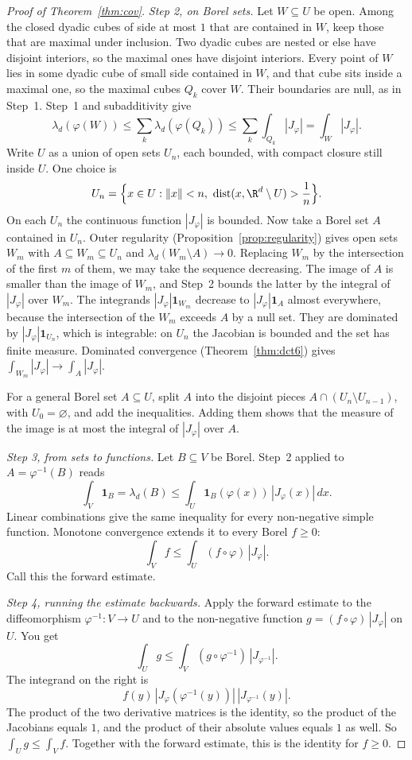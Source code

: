 \begin{proof}[Proof of Theorem~\ref{thm:cov}]
\emph{Step 2, on Borel sets.} Let $W\subseteq U$ be open. Among the closed dyadic cubes of side at most $1$ that are contained in $W$, keep those that are maximal under inclusion. Two dyadic cubes are nested or else have disjoint interiors, so the maximal ones have disjoint interiors. Every point of $W$ lies in some dyadic cube of small side contained in $W$, and that cube sits inside a maximal one, so the maximal cubes $Q_k$ cover $W$. Their boundaries are null, as in Step~1. Step~1 and subadditivity give
\[
\lambda_d(\varphi(W))\le\sum_k\lambda_d(\varphi(Q_k))\le\sum_k\int_{Q_k}|J_\varphi|=\int_W|J_\varphi|.
\]
Write $U$ as a union of open sets $U_n$, each bounded, with compact closure still inside $U$. One choice is
\[
U_n=\Bigl\{x\in U:\|x\|<n,\ \mathrm{dist}(x,\R^d\setminus U)>\frac1n\Bigr\}.
\]
On each $U_n$ the continuous function $|J_\varphi|$ is bounded. Now take a Borel set $A$ contained in $U_n$. Outer regularity (Proposition~\ref{prop:regularity}) gives open sets $W_m$ with $A\subseteq W_m\subseteq U_n$ and $\lambda_d(W_m\setminus A)\to 0$. Replacing $W_m$ by the intersection of the first $m$ of them, we may take the sequence decreasing. The image of $A$ is smaller than the image of $W_m$, and Step~2 bounds the latter by the integral of $|J_\varphi|$ over $W_m$. The integrands $|J_\varphi|\mathbf 1_{W_m}$ decrease to $|J_\varphi|\mathbf 1_A$ almost everywhere, because the intersection of the $W_m$ exceeds $A$ by a null set. They are dominated by $|J_\varphi|\mathbf 1_{U_n}$, which is integrable: on $U_n$ the Jacobian is bounded and the set has finite measure. Dominated convergence (Theorem~\ref{thm:dct6}) gives $\int_{W_m}|J_\varphi|\to\int_A|J_\varphi|$.

For a general Borel set $A\subseteq U$, split $A$ into the disjoint pieces $A\cap(U_n\setminus U_{n-1})$, with $U_0=\varnothing$, and add the inequalities. Adding them shows that the measure of the image is at most the integral of $|J_\varphi|$ over $A$.

\emph{Step 3, from sets to functions.} Let $B\subseteq V$ be Borel. Step~2 applied to $A=\varphi^{-1}(B)$ reads
\[
\int_V\mathbf 1_B=\lambda_d(B)\le\int_U\mathbf 1_B(\varphi(x))\,|J_\varphi(x)|\,dx.
\]
Linear combinations give the same inequality for every non-negative simple function. Monotone convergence extends it to every Borel $f\ge 0$:
\[
\int_V f\le\int_U(f\circ\varphi)\,|J_\varphi|.
\]
Call this the forward estimate.

\emph{Step 4, running the estimate backwards.} Apply the forward estimate to the diffeomorphism $\varphi^{-1}:V\to U$ and to the non-negative function $g=(f\circ\varphi)\,|J_\varphi|$ on $U$. You get
\[
\int_U g\le\int_V(g\circ\varphi^{-1})\,|J_{\varphi^{-1}}|.
\]
The integrand on the right is
\[
f(y)\,|J_\varphi(\varphi^{-1}(y))|\,|J_{\varphi^{-1}}(y)|.
\]
The product of the two derivative matrices is the identity, so the product of the Jacobians equals $1$, and the product of their absolute values equals $1$ as well. So $\int_U g\le\int_V f$. Together with the forward estimate, this is the identity for $f\ge 0$.


\end{proof}
